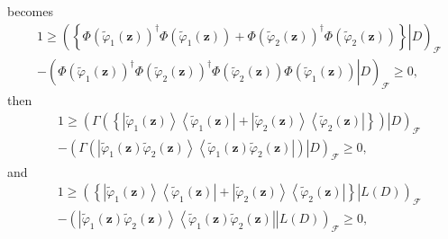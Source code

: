 \documentclass[aps,preprint]{revtex4}%
\begin{document}
becomes
\begin{align}
&  1\geq\left(  \left.  \left\{  \Phi\left(  \tilde{\varphi}_{1}\left(
\mathbf{z}\right)  \right)  ^{\dagger}\Phi\left(  \tilde{\varphi}_{1}\left(
\mathbf{z}\right)  \right)  +\Phi\left(  \tilde{\varphi}_{2}\left(
\mathbf{z}\right)  \right)  ^{\dagger}\Phi\left(  \tilde{\varphi}_{2}\left(
\mathbf{z}\right)  \right)  \right\}  \right\vert D\right)  _{\mathcal{F}%
}\nonumber\\
&  \left.  -\right.  \left(  \left.  \Phi\left(  \tilde{\varphi}_{1}\left(
\mathbf{z}\right)  \right)  ^{\dagger}\Phi\left(  \tilde{\varphi}_{2}\left(
\mathbf{z}\right)  \right)  ^{\dagger}\Phi\left(  \tilde{\varphi}_{2}\left(
\mathbf{z}\right)  \right)  \Phi\left(  \tilde{\varphi}_{1}\left(
\mathbf{z}\right)  \right)  \right\vert D\right)  _{\mathcal{F}}\geq0,
\end{align}
then
\begin{align}
&  1\geq\left(  \left.  \Gamma\left(  \left\{  \left\vert \tilde{\varphi}%
_{1}\left(  \mathbf{z}\right)  \right\rangle \left\langle \tilde{\varphi}%
_{1}\left(  \mathbf{z}\right)  \right\vert +\left\vert \tilde{\varphi}%
_{2}\left(  \mathbf{z}\right)  \right\rangle \left\langle \tilde{\varphi}%
_{2}\left(  \mathbf{z}\right)  \right\vert \right\}  \right)  \right\vert
D\right)  _{\mathcal{F}}\nonumber\\
&  \left.  -\right.  \left(  \left.  \Gamma\left(  \left\vert \tilde{\varphi
}_{1}\left(  \mathbf{z}\right)  \tilde{\varphi}_{2}\left(  \mathbf{z}\right)
\right\rangle \left\langle \tilde{\varphi}_{1}\left(  \mathbf{z}\right)
\tilde{\varphi}_{2}\left(  \mathbf{z}\right)  \right\vert \right)  \right\vert
D\right)  _{\mathcal{F}}\geq0,
\end{align}
and
\begin{align}
&  1\geq\left(  \left.  \left\{  \left\vert \tilde{\varphi}_{1}\left(
\mathbf{z}\right)  \right\rangle \left\langle \tilde{\varphi}_{1}\left(
\mathbf{z}\right)  \right\vert +\left\vert \tilde{\varphi}_{2}\left(
\mathbf{z}\right)  \right\rangle \left\langle \tilde{\varphi}_{2}\left(
\mathbf{z}\right)  \right\vert \right\}  \right\vert L\left(  D\right)
\right)  _{\mathcal{F}}\nonumber\\
&  \left.  -\right.  \left(  \left.  \left\vert \tilde{\varphi}_{1}\left(
\mathbf{z}\right)  \tilde{\varphi}_{2}\left(  \mathbf{z}\right)  \right\rangle
\left\langle \tilde{\varphi}_{1}\left(  \mathbf{z}\right)  \tilde{\varphi}%
_{2}\left(  \mathbf{z}\right)  \right\vert \right\vert L\left(  D\right)
\right)  _{\mathcal{F}}\geq0,
\end{align}
\end{document}
